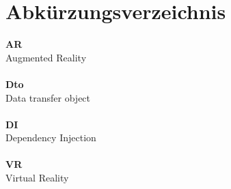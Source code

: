 \section*{Abkürzungsverzeichnis}
\label{sec:abbrev}
  \textbf{AR}\\
  Augmented Reality\\~\\
  \textbf{Dto}\\
  Data transfer object\\~\\
  \textbf{DI}\\
  Dependency Injection\\~\\
  \textbf{VR}\\
  Virtual Reality\\~\\
